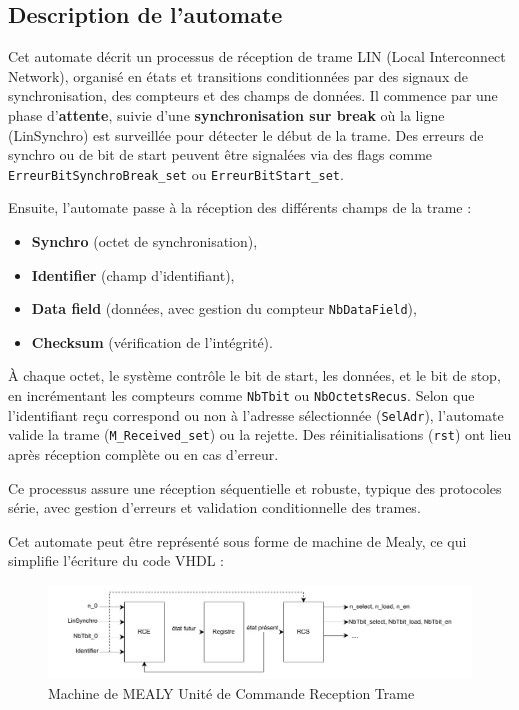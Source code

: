 \subsection*{Description de l'automate}
Cet automate décrit un processus de réception de trame LIN (Local Interconnect Network), organisé en états et transitions conditionnées par des signaux de synchronisation, des compteurs et des champs de données. Il commence par une phase d’\textbf{attente}, suivie d’une \textbf{synchronisation sur break} où la ligne (LinSynchro) est surveillée pour détecter le début de la trame. Des erreurs de synchro ou de bit de start peuvent être signalées via des flags comme \texttt{ErreurBitSynchroBreak\_set} ou \texttt{ErreurBitStart\_set}.

Ensuite, l’automate passe à la réception des différents champs de la trame :
\begin{itemize}
    \item \textbf{Synchro} (octet de synchronisation),
    \item \textbf{Identifier} (champ d’identifiant),
    \item \textbf{Data field} (données, avec gestion du compteur \texttt{NbDataField}),
    \item \textbf{Checksum} (vérification de l’intégrité).
\end{itemize}

À chaque octet, le système contrôle le bit de start, les données, et le bit de stop, en incrémentant les compteurs comme \texttt{NbTbit} ou \texttt{NbOctetsRecus}. Selon que l’identifiant reçu correspond ou non à l’adresse sélectionnée (\texttt{SelAdr}), l’automate valide la trame (\texttt{M\_Received\_set}) ou la rejette. Des réinitialisations (\texttt{rst}) ont lieu après réception complète ou en cas d’erreur.

Ce processus assure une réception séquentielle et robuste, typique des protocoles série, avec gestion d’erreurs et validation conditionnelle des trames.

Cet automate peut être représenté sous forme de machine de Mealy, ce qui simplifie l’écriture du code VHDL : 

\begin{figure}[H]
    \centering
    \includegraphics[width=0.8\linewidth]{images/inter/MEALY_Reception_trame.pdf}
    \caption{Machine de MEALY Unité de Commande Reception Trame}
    \label{fig:placeholder}
\end{figure}

